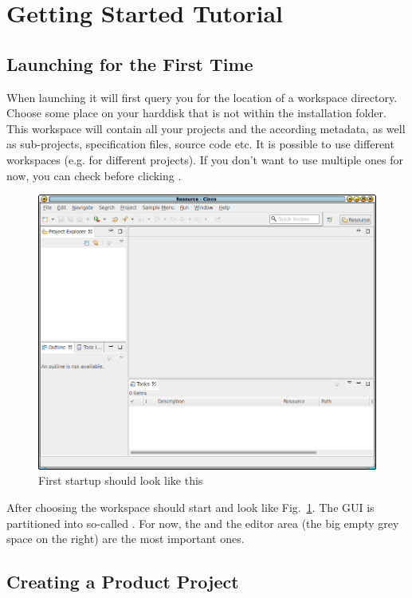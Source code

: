 \documentclass[a4paper,american,12pt]{scrreprt}
\begin{document}
\section{Getting Started Tutorial}

\subsection{Launching \cinco for the First Time}
\label{sec:firstLaunch}

When launching \cinco{} it will first query you for the location of a workspace
directory. Choose some place on your harddisk that is not within the \cinco
installation folder. This workspace will contain all your \cinco projects
and the according metadata, as well as sub-projects, specification files, source
code etc. It is possible to use different workspaces (e.g. for different
projects). If you don't want to use multiple ones for now, you can check
 before clicking .

\begin{figure}
	\centering
	\includegraphics[width=.7\textwidth]{screenshots/cinco-gui-firststart.png} 
	\caption{First startup should look like this}
	\label{fig:firstStart}
\end{figure}

After choosing the workspace \cinco should start and look like
Fig.~\ref{fig:firstStart}. The GUI is partitioned into so-called
. For now, the  and the editor area (the
big empty grey space on the right) are the most important ones. 

\subsection{Creating a \cinco Product Project}
\end{document}
